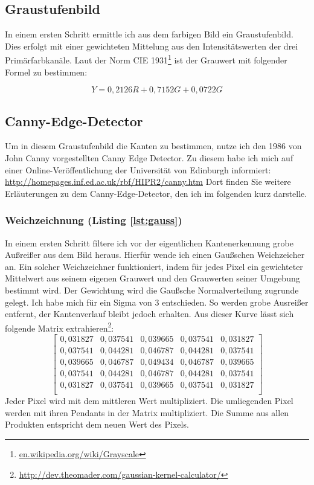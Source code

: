 \subsection{Graustufenbild}
In einem ersten Schritt ermittle ich aus dem farbigen Bild ein Graustufenbild. Dies erfolgt mit einer gewichteten Mittelung aus den Intensitätswerten der drei Primärfarbkanäle. Laut der Norm CIE 1931\footnote{\url{en.wikipedia.org/wiki/Grayscale}} ist der Grauwert mit folgender Formel zu bestimmen:

\begin{equation}
Y = 0,2126R+0,7152G+0,0722G
\end{equation}

\subsection{Canny-Edge-Detector}
Um in diesem Graustufenbild die Kanten zu bestimmen, nutze ich den 1986 von John Canny vorgestellten Canny Edge Detector. Zu diesem habe ich mich auf einer Online-Veröffentlichung der Universität von Edinburgh informiert: \url{http://homepages.inf.ed.ac.uk/rbf/HIPR2/canny.htm} Dort finden Sie weitere Erläuterungen zu dem Canny-Edge-Detector, den ich im folgenden kurz darstelle.

\subsubsection{Weichzeichnung (Listing \ref{lst:gauss})}
In einem ersten Schritt filtere ich vor der eigentlichen Kantenerkennung grobe Außreißer aus dem Bild heraus. Hierfür wende ich einen Gaußschen Weichzeicher an. Ein solcher Weichzeichner funktioniert, indem für jedes Pixel ein gewichteter Mittelwert aus seinem eigenen Grauwert und den Grauwerten seiner Umgebung bestimmt wird. Der Gewichtung wird die Gaußsche Normalverteilung zugrunde gelegt. Ich habe mich für ein Sigma von 3 entschieden. So werden grobe Ausreißer entfernt, der Kantenverlauf bleibt jedoch erhalten. Aus dieser Kurve lässt sich folgende Matrix extrahieren\footnote{\url{http://dev.theomader.com/gaussian-kernel-calculator/}}:
\begin{equation}
	\begin{bmatrix}
	0,031827&0,037541&0,039665&0,037541&0,031827 \\
	0,037541&0,044281&0,046787&0,044281&0,037541 \\
	0,039665&0,046787&0,049434&0,046787&0,039665 \\
	0,037541&0,044281&0,046787&0,044281&0,037541 \\
	0,031827&0,037541&0,039665&0,037541&0,031827 \\
	\end{bmatrix}
\end{equation}
Jeder Pixel wird mit dem mittleren Wert multipliziert. Die umliegenden Pixel werden mit ihren Pendants in der Matrix multipliziert. Die Summe aus allen Produkten entspricht dem neuen Wert des Pixels.

